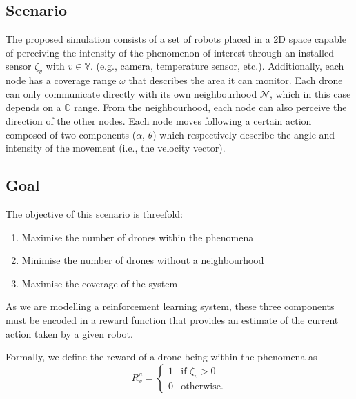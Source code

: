 \documentclass[conference]{IEEEtran}
\begin{document}
\subsection{Scenario}
The proposed simulation consists 
 of a set of robots placed in a 2D space capable of perceiving the intensity 
 of the phenomenon of interest through an installed sensor $\zeta_v$ with $v \in \mathbb{V}$. 
 (e.g., camera, temperature sensor, etc.). 
%
Additionally, each node has a coverage range $\omega$ 
 that describes the area it can monitor. 
 Each drone can only communicate directly with its own neighbourhood $\mathcal{N}$, 
 which in this case depends on a $\mathbb{O}$ range. 
From the neighbourhood, 
 each node can also perceive the direction of the other nodes.
%
Each node moves following a certain action composed of two components ($\alpha$, $\theta$) 
 which respectively describe the angle and intensity of the movement (i.e., the velocity vector).
\subsection{Goal}
 The objective of this scenario is threefold:
\begin{enumerate}
\item Maximise the number of drones within the phenomena
\item Minimise the number of drones without a neighbourhood
\item Maximise the coverage of the system
\end{enumerate}
 
As we are modelling a reinforcement learning system, 
 these three components must be encoded in a reward function 
 that provides an estimate of the current action taken by a given robot.
 
Formally, we define the reward of a drone being within the phenomena as
 \begin{equation*}
 R^a_{v} = \begin{cases}
  1 & \text{if } \zeta_v > 0 \\
  0 & \text{otherwise.} 
 \end{cases}
 \end{equation*}
 
\end{document}
